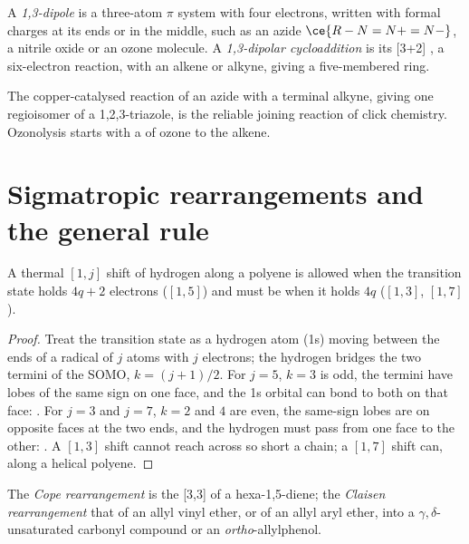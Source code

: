 \begin{definition}\label{def:b3:pericyclic:dipolar}
A \emph{1,3-dipole} is a three-atom $\pi$ system with four
electrons, written with formal charges at its ends or in the middle, such as an
azide $\ce{R-N=N+=N-}$, a nitrile oxide or an ozone molecule. A \emph{1,3-dipolar
cycloaddition} is its [3+2] , a
six-electron reaction, with an alkene or alkyne, giving a five-membered ring.
\end{definition}

The copper-catalysed reaction of an azide with a terminal alkyne, giving one
regioisomer of a 1,2,3-triazole, is the reliable joining reaction of click
chemistry. Ozonolysis starts with a  of ozone to the
alkene.

\section{Sigmatropic rearrangements and the general rule}

\begin{proposition}\label{prop:b3:pericyclic:sigmatropic-h}
A thermal $[1, j]$ shift of hydrogen along a polyene is allowed  when the
transition state holds $4q + 2$ electrons ($[1,5]$) and must be  when it holds $4q$
($[1,3]$, $[1,7]$).
\end{proposition}

\begin{proof}
Treat the transition state as a hydrogen atom (1s) moving between the ends of a
radical of $j$ atoms with $j$ electrons; the hydrogen bridges the two termini of the
SOMO, $k = (j + 1)/2$. For $j = 5$, $k = 3$ is odd, the termini have lobes of the same sign on one face,
and the 1s orbital can bond to both on that face: . For $j = 3$ and $j = 7$,
$k = 2$ and $4$ are even, the same-sign lobes are on opposite faces at the two ends, and
the hydrogen must pass from one face to the other: . A $[1,3]$ shift
cannot reach across so short a chain; a $[1,7]$ shift can, along a helical polyene.
\end{proof}

\begin{definition}\label{def:b3:pericyclic:cope-claisen}
The \emph{Cope rearrangement} is the [3,3] 
of a hexa-1,5-diene; the \emph{Claisen
rearrangement} that of an allyl vinyl ether, or of
an allyl aryl ether, into a $\gamma,\delta$-unsaturated carbonyl compound or an \textit{ortho}-allylphenol.
\end{definition}

